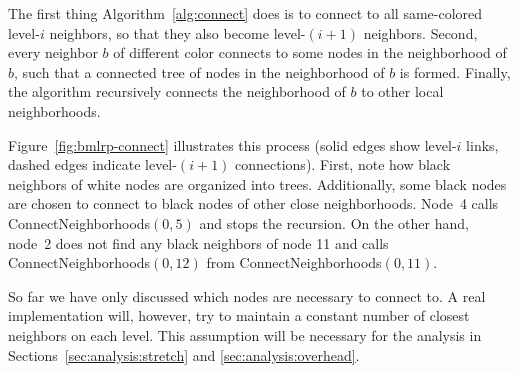 \documentclass[conference]{IEEEtran}
\theoremstyle{definition}
\begin{document}
The first thing Algorithm~\ref{alg:connect} does is to connect to all same-colored level-$i$ neighbors, so that they also become level-$(i+1)$ neighbors. Second,  every neighbor $b$ of different color connects to some nodes in the neighborhood of $b$, such that a connected tree of nodes in the neighborhood of $b$ is formed. Finally, the algorithm recursively connects the neighborhood of $b$ to other local neighborhoods.

Figure~\ref{fig:bmlrp-connect} illustrates this process (solid edges show 
level-$i$ links, dashed edges indicate level-$(i+1)$ connections). First, note how black neighbors of white nodes are organized into trees. Additionally, some black nodes are chosen to connect to black nodes of other close neighborhoods. Node~4 calls ConnectNeighborhoods$(0, 5)$ and stops the recursion. On the other hand, node~2 does not find any black neighbors of node 11 and 
calls ConnectNeighborhoods$(0, 12)$ from ConnectNeighborhoods$(0, 11)$.



So far we have only discussed which nodes are necessary to connect to. A real implementation will, however, try to maintain a constant number of closest neighbors on each level. This assumption will be necessary for 
the analysis in Sections~\ref{sec:analysis:stretch} and \ref{sec:analysis:overhead}.
\end{document}
